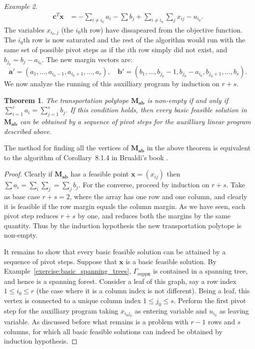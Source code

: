 \documentclass{amsbook}
\newcommand{\xx}{\mathbf x}
\newcommand{\cc}{\mathbf c}
\newcommand{\bb}{\mathbf b}
\renewcommand{\aa}{\mathbf a}
\newcommand{\supp}{\mathrm{supp}}
\newcommand{\MM}{\mathbf M}
\newtheorem{theorem}{Theorem}[section]
\theoremstyle{definition}
\theoremstyle{remark}
\newtheorem{example}[theorem]{Example}
\begin{document}
\begin{example}
\begin{displaymath}
\begin{matrix}
      \hline
      \cc^T\xx & = -\sum_{i\neq i_0} a_i - \sum b_j + \sum_{i\neq i_0}\sum_jx_{ij} -u_{i_0}. 
    \end{matrix}
  \end{displaymath}
  The variables $x_{i_0,j}$ (the $i_0$th row) have dissapeared from the objective function.
  The $i_0$th row is now saturated and the rest of the algorithm would run with the same set of possible pivot steps as if the $i$th row simply did not exist, and $b_{j_0}=b_j-a_{i_0}$.
  The new margin vectors are:
  \begin{displaymath}
    \aa' = (a_1,\dotsc,a_{i_0-1},a_{i_0+1},\dotsc,a_r),\quad \bb'=(b_1,\dotsc,b_{j_0}-1,b_{j_0}-a_{i_0},b_{j_0+1},\dotsc,b_s).
  \end{displaymath}
  We now analyze the running of this auxilliary program by induction on $r+s$.
  \begin{theorem}
    \label{theorem:brualdi-algo}
    The transportation polytope $\MM_{\aa\bb}$ is non-empty if and only if $\sum_{i=1}^r a_i=\sum_{j=1}^s b_j$.
    If this condition holds, then every basic feasible solution in $\MM_{\aa\bb}$ can be obtained by a sequence of pivot steps for the auxilliary linear program described above.
  \end{theorem}
  The method for finding all the vertices of $\MM_{\aa\bb}$ in the above theorem is equivalent to the algorithm of Corollary~8.1.4 in Brualdi's book \cite{Brualdi}. 
  \begin{proof}
    Clearly if $\MM_{\aa\bb}$ has a feasible point $\xx=(x_{ij})$ then $\sum a_i=\sum_i\sum_j=\sum_jb_j$.
    For the converse, proceed by induction on $r+s$.
    Take as base case $r+s=2$, where the array has one row and one column, and clearly it is feasible if the row margin equals the column margin.
    As we have seen, each pivot step reduces $r+s$ by one, and reduces both the margins by the same quantity.
    Thus by the induction hypothesis the new transportation polytope is non-empty.

    It remains to show that every basic feasible solution can be attained by a sequence of pivot steps.
    Suppose that $\xx$ is a basic feasible solution.
    By Example~\ref{exercise:basic_spanning_trees}, $\Gamma_{\supp\xx}$ is contained in a spanning tree, and hence is a spanning forest.
    Consider a leaf of this graph, say a row index $1\leq i_0\leq r$ (the case where it is a column index is not different).
    Being a leaf, this vertex is connected to a unique column index $1\leq j_0\leq s$.
    Perform the first pivot step for the auxilliary program taking $x_{i_0j_0}$ as entering variable and $u_{i_0}$ as leaving variable.
    As discussed before what remains is a problem with $r-1$ rows and $s$ columns, for which all basic feasible solutions can indeed be obtained by induction hypothesis.
  \end{proof}
\end{example}  
\end{document}
